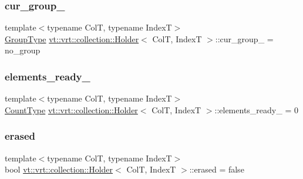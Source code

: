 \subsubsection{\texorpdfstring{cur\+\_\+group\+\_\+}{cur\_group\_}}
{\footnotesize\ttfamily template$<$typename ColT, typename IndexT$>$ \\
\hyperlink{namespacevt_a27b5e4411c9b6140c49100e050e2f743}{Group\+Type} \hyperlink{structvt_1_1vrt_1_1collection_1_1_holder}{vt\+::vrt\+::collection\+::\+Holder}$<$ ColT, IndexT $>$\+::cur\+\_\+group\+\_\+ = no\+\_\+group\hspace{0.3cm}{\ttfamily [private]}}

\mbox{\label{structvt_1_1vrt_1_1collection_1_1_holder_afe1f0824cb54316478fb364f0d88ad78}} 
\subsubsection{\texorpdfstring{elements\+\_\+ready\+\_\+}{elements\_ready\_}}
{\footnotesize\ttfamily template$<$typename ColT, typename IndexT$>$ \\
\hyperlink{structvt_1_1vrt_1_1collection_1_1_holder_a3251a556ac19fc7dc4d0bd388cfaedeb}{Count\+Type} \hyperlink{structvt_1_1vrt_1_1collection_1_1_holder}{vt\+::vrt\+::collection\+::\+Holder}$<$ ColT, IndexT $>$\+::elements\+\_\+ready\+\_\+ = 0\hspace{0.3cm}{\ttfamily [private]}}

\mbox{\label{structvt_1_1vrt_1_1collection_1_1_holder_a2d053dab199764dce3029b8a55cbf1cc}} 
\subsubsection{\texorpdfstring{erased}{erased}}
{\footnotesize\ttfamily template$<$typename ColT, typename IndexT$>$ \\
bool \hyperlink{structvt_1_1vrt_1_1collection_1_1_holder}{vt\+::vrt\+::collection\+::\+Holder}$<$ ColT, IndexT $>$\+::erased = false\hspace{0.3cm}{\ttfamily [private]}}


